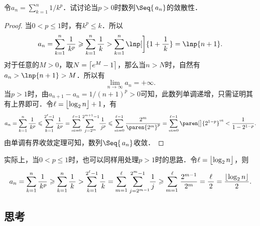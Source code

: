 \begin{example*}
  令\(a_n = \sum\limits_{k=1}^n 1/k^p\)．试讨论当\(p > 0\)时数列\(\Seq{\,a_n}\)的敛散性．

  \begin{proof}
    当\(0 < p \le 1\)时，有\(k^p \le k\)．所以
    \begin{equation*}
      a_n = \sum_{k=1}^n \frac1{\,k^p} \ge \sum_{k=1}^n \frac1{\,k\,}
      > \sum_{k=1}^n \lnp[\bigg]{1+\frac1{\,k\,}} = \lnp{n+1}.
    \end{equation*}
    对于任意的\(M > 0\)，取\(N = \ceil[\big]{e^M - 1}\)，那么当\(n > N\)时，自然有\(a_n > \lnp{n+1} > M\)．所以有
    \begin{equation*}
      \lim_{n\to\infty} a_n = +\infty.
    \end{equation*}
    当\(p > 1\)时，由\(a_{n+1} - a_n = 1/(n+1)^p > 0\)可知，此数列单调递增，只需证明其有上界即可．令\(\ell = \floor[\big]{\log_2 n} + 1\)，有
    \begin{equation*}
      a_n
      = \sum_{k=1}^n \frac1{\,k^p}
      \le \sum_{k=1}^{2^\ell-1} \frac1{\,k^p}
      = \sum_{m=0}^{\ell-1} \! \sum_{\,j=2^m\!}^{\,2^{m+1}-1\!\!} \frac{1}{\,j^p}
      \le \sum_{m=0}^{\ell-1} \frac{2^m}{\paren{2^m}^p}
      = \sum_{m=0}^{\ell-1} \paren[\big]{2^{1-p}}^m
      < \frac{1}{1-2^{1-p}}.
    \end{equation*}
    由单调有界收敛定理可知，数列\(\Seq{\,a_n}\)收敛．
  \end{proof}
  \begin{remark}
    实际上，当\(0 < p \le 1\)时，也可以同样用处理\(p > 1\)时的思路．令\(\ell = \floor[\big]{\log_2 n}\)，则
    \begin{equation*}
      a_n
      = \sum_{k=1}^n \frac1{\,k^p}
      \ge \sum_{k=1}^n \frac1{\,k\,}
      > \sum_{k=1}^{2^\ell-1} \frac1{\,k}
      = \sum_{m=1}^{\ell} \! \sum_{\,\,j=2^{m-1}\!\!}^{2^m-1} \frac{1}{\,j\,}
      \ge \sum_{m=1\,}^{\ell} \frac{2^{m-1}}{2^m}
      = \frac{\ell}{\,2\,}
      = \frac{\floor{\log_2 n}}{2}.
    \end{equation*}
  \end{remark}
\end{example*}

\subsection*{思考}

